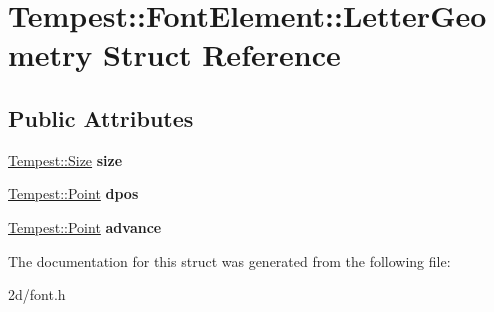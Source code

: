 \hypertarget{struct_tempest_1_1_font_element_1_1_letter_geometry}{\section{Tempest\+:\+:Font\+Element\+:\+:Letter\+Geometry Struct Reference}
\label{struct_tempest_1_1_font_element_1_1_letter_geometry}
}
\subsection*{Public Attributes}
\begin{DoxyCompactItemize}
\item 
\hypertarget{struct_tempest_1_1_font_element_1_1_letter_geometry_a0c5fbd0081070532f3becaf600c4efc6}{\hyperlink{struct_tempest_1_1_size}{Tempest\+::\+Size} {\bfseries size}}\label{struct_tempest_1_1_font_element_1_1_letter_geometry_a0c5fbd0081070532f3becaf600c4efc6}

\item 
\hypertarget{struct_tempest_1_1_font_element_1_1_letter_geometry_af82814ba2b9ab2a1dcb0e093abb9a4e3}{\hyperlink{struct_tempest_1_1_point}{Tempest\+::\+Point} {\bfseries dpos}}\label{struct_tempest_1_1_font_element_1_1_letter_geometry_af82814ba2b9ab2a1dcb0e093abb9a4e3}

\item 
\hypertarget{struct_tempest_1_1_font_element_1_1_letter_geometry_a156ef7720039e8af14e8d395779e3e2c}{\hyperlink{struct_tempest_1_1_point}{Tempest\+::\+Point} {\bfseries advance}}\label{struct_tempest_1_1_font_element_1_1_letter_geometry_a156ef7720039e8af14e8d395779e3e2c}

\end{DoxyCompactItemize}


The documentation for this struct was generated from the following file\+:\begin{DoxyCompactItemize}
\item 
2d/font.\+h\end{DoxyCompactItemize}
